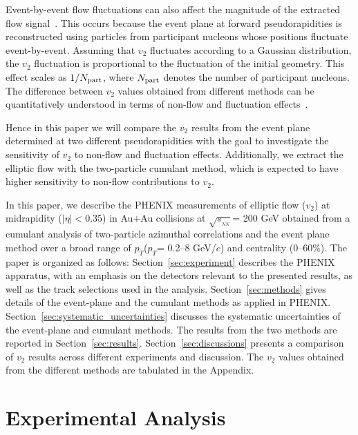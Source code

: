 \documentclass[aps,prc,superscriptaddress,showpacs,floatfix,twocolumn]{revtex4}
\newcommand \gevc{GeV/$c$\xspace}
\newcommand \pt{\mbox{$p_T$}\xspace}
\newcommand \Np{\mbox{$N_{\rm part}$}\xspace}
\newcommand \sqsn{\mbox{$\sqrt{s_{_{NN}}}$}\xspace}
\newcommand \Au{{Au+Au}\xspace}
\begin{document}
Event-by-event flow fluctuations can also affect the magnitude 
of the extracted flow signal~\cite{Sorensen:2008zk}. This occurs 
because the event plane at forward pseudorapidities is 
reconstructed using particles from participant nucleons whose 
positions fluctuate event-by-event. Assuming that $v_2$ 
fluctuates according to a Gaussian distribution, the $v_2$ 
fluctuation is proportional to the fluctuation of the initial 
geometry. This effect scales as $1/\Np$, where \Np denotes the 
number of participant nucleons. The difference between $v_2$ 
values obtained from different methods can be quantitatively 
understood in terms of non-flow and fluctuation 
effects~\cite{Ollitrault:2009ie}.

Hence in this paper we will compare the $v_2$ results from the 
event plane determined at two different pseudorapidities with 
the goal to investigate the sensitivity of $v_2$ to non-flow and 
fluctuation effects. Additionally, we extract the elliptic flow 
with the two-particle cumulant method, which is expected to have 
higher sensitivity to non-flow contributions to $v_2$.

In this paper, we describe the PHENIX measurements of elliptic 
flow ($v_2$) at midrapidity ($|\eta| < 0.35$) in \Au collisions 
at \sqsn = 200 GeV obtained from a cumulant analysis of 
two-particle azimuthal correlations and the event plane method 
over a broad range of \pt (\pt = 0.2--8 \gevc) and centrality 
(0--60\%). The paper is organized as follows: 
Section~\ref{sec:experiment} describes the PHENIX apparatus, 
with an emphasis on the detectors relevant to the presented 
results, as well as the track selections used in the analysis. 
Section~\ref{sec:methods} gives details of the event-plane and 
the cumulant methods as applied in PHENIX. 
Section~\ref{sec:systematic_uncertainties} discusses the 
systematic uncertainties of the event-plane and cumulant 
methods. The results from the two methods are reported in 
Section~\ref{sec:results}. Section~\ref{sec:discussions} 
presents a comparison of $v_2$ results across different 
experiments and discussion.  The $v_2$ values obtained from the 
different methods are tabulated in the Appendix.

\section{Experimental Analysis \label{sec:experiment}}
\end{document}
